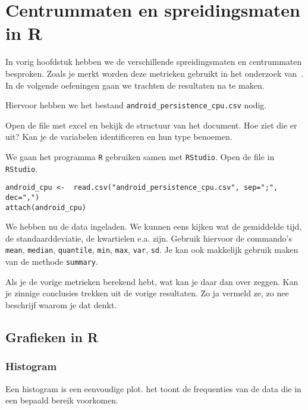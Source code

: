 \section{Centrummaten en spreidingsmaten in R}
In vorig hoofdstuk hebben we de verschillende spreidingsmaten en centrummaten besproken. Zoals je merkt worden deze metrieken gebruikt in het onderzoek van~\textcite{Akin2016}. In de volgende oefeningen gaan we trachten de resultaten na te maken. 

Hiervoor hebben we het bestand \texttt{android\_persistence\_cpu.csv} nodig. 

\begin{exercise}
  \label{oef:casus-akin2016-1var}
	Open de file met excel en bekijk de structuur van het document. Hoe ziet die er uit? Kan je de variabelen identificeren en hun type benoemen. 
\end{exercise}

We gaan het programma \texttt{R} gebruiken samen met \texttt{RStudio}. Open de file in \texttt{RStudio}.

\begin{lstlisting}
android_cpu <-  read.csv("android_persistence_cpu.csv", sep=";", dec=",")
attach(android_cpu)
\end{lstlisting}

We hebben nu de data ingeladen. We kunnen eens kijken wat de gemiddelde tijd, de standaarddeviatie, de kwartielen e.a. zijn. Gebruik hiervoor de commando's \texttt{mean}, \texttt{median}, \texttt{quantile}, \texttt{min}, \texttt{max}, \texttt{var}, \texttt{sd}. Je kan ook makkelijk gebruik maken van de methode \texttt{summary}.

\begin{exercise}
	Als je de vorige metrieken berekend hebt, wat kan je daar dan over zeggen. Kan je zinnige conclusies trekken uit de vorige resultaten. Zo ja vermeld ze, zo nee beschrijf waarom je dat denkt.
\end{exercise}

\subsection{Grafieken in R}

\subsubsection{Histogram}

Een histogram is een eenvoudige plot. het toont de frequenties van de data die in een bepaald bereik voorkomen. 

